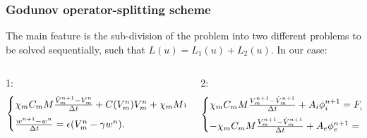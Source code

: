 \documentclass[9pt]{beamer}
\begin{document}
\begin{frame}
\frametitle{Godunov operator-splitting scheme}
The main feature is the sub-division of the problem into two different problems to be solved sequentially, such that $L(u)=L_1(u)+L_2(u)$. In our case:
\vspace{2mm}
\begin{columns}
            \begin{column}{0.5\textwidth}
\small 1:
 \begin{equation*}
\begin{cases}
\chi_m C_m M\frac{\hat{V}_m^{n+1} - V_m^n}{\Delta t} + C(V_m^n)V_m^n +\chi_mMw^n = 0,\vspace{2mm}\\
\frac{w^{n+1}-w^n}{\Delta t} = \epsilon (V_m^n - \gamma w^n).
\end{cases}
\end{equation*}
            \end{column}
            \hspace{1cm}
            \begin{column}{0.5\textwidth}  
            \small 2:
\begin{equation*}
\begin{cases}
\chi_m C_m M\frac{V_m^{n+1} - \hat{V}_m^{n+1}}{\Delta t} + A_i\phi_i^{n+1} = F_i^{n+1}, \vspace{2mm}\\
-\chi_m C_m M\frac{V_m^{n+1} - \hat{V}_m^{n+1}}{\Delta t} + A_e\phi_e^{n+1} = F_e^{n+1}.
\end{cases}
\end{equation*}


\end{column}
\end{columns}
\end{frame}
\end{document}
